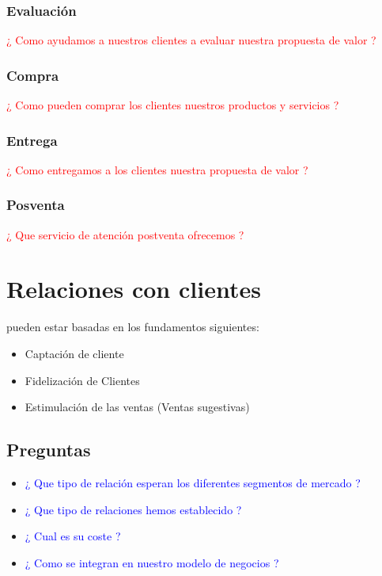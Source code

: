 \documentclass[11pt]{book}
\begin{document}
\subsection{Evaluación}
\textcolor{red}{¿ Como ayudamos a nuestros clientes a evaluar nuestra propuesta de valor ?}
\subsection{Compra}
\textcolor{red}{¿ Como pueden comprar los clientes nuestros productos y servicios ?}
\subsection{Entrega}
\textcolor{red}{¿ Como entregamos a los clientes nuestra propuesta de valor ?}
\subsection{Posventa}
\textcolor{red}{¿ Que servicio de atención postventa ofrecemos ?}


\chapter{Relaciones con clientes}
pueden estar basadas en los fundamentos siguientes:\\

\begin{itemize}
\item Captación de cliente\\
\item Fidelización de Clientes\\
\item Estimulación de las ventas (Ventas sugestivas)
\end{itemize}
\section{Preguntas}
\begin{itemize}
\item\textcolor{blue}{¿ Que tipo de relación esperan los diferentes segmentos de mercado ?}
\item\textcolor{blue}{¿ Que tipo de relaciones hemos establecido ?}
\item\textcolor{blue}{¿ Cual es su coste ?}
\item\textcolor{blue}{¿ Como se integran en nuestro modelo de negocios ?}
\end{itemize}
\end{document}
